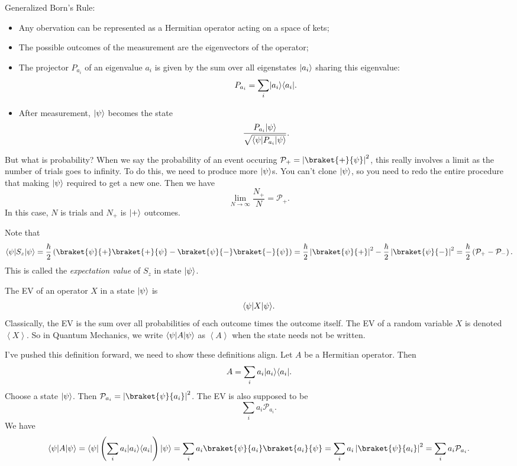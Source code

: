 \begin{mdframed}
	Generalized Born's Rule:
	\begin{itemize}
		\item Any obervation can be represented as a Hermitian operator acting on a space of kets;
		\item The possible outcomes of the measurement are the eigenvectors of the operator;
		\item The projector $P_{a_i} $ of an eigenvalue $a_i$ is given by the sum over all eigenstates $\lvert a_i\rangle $ sharing this eigenvalue:
			\[
				P_{a_i} =\sum_{i} \lvert a_i\rangle \langle a_i\rvert 
			.\]
		\item After measurement, $\lvert\psi \rangle $ becomes the state
			\[
				\frac{P_{a_i} \lvert\psi \rangle }{\sqrt{\langle\psi \rvert P_{a_i} \lvert\psi \rangle } } 
			.\]
	\end{itemize}
\end{mdframed}

But what is probability? When we say the probability of an event occuring $\mathcal{P}_+=\left| \braket{+}{\psi }  \right|^2$, this really involves a limit as the number of trials goes to infinity. To do this, we need to produce more $\lvert\psi \rangle $s. You can't clone $\lvert\psi \rangle $, so you need to redo the entire procedure that making $\lvert\psi \rangle $ required to get a new one. Then we have
\[
	\lim_{N \to \infty} \frac{N_+}{N} =\mathcal{P}_+
.\]
In this case, $N$ is trials and $N_+$ is $\lvert+\rangle $ outcomes.

Note that
\[
	\bra{\psi } S_z \ket{\psi } = \frac{\hbar}{2} \left( \braket{\psi }{+} \braket{+}{\psi } -\braket{\psi }{-} \braket{-}{\psi }  \right) =\frac{\hbar}{2} \left| \braket{\psi }{+}  \right| ^2 - \frac{\hbar}{2} \left| \braket{\psi }{-}  \right| ^2 = \frac{\hbar}{2} \left( \mathcal{P}_+-\mathcal{P}_- \right)
.\]
This is called the \emph{expectation value} of $S_z$ in state $\lvert\psi \rangle $.
\begin{definition}\label{dfn:EV}
	The EV of an operator $X$ in a state $\lvert\psi \rangle $ is
	\[
		\langle\psi \rvert X \lvert\psi \rangle
	.\]
	Classically, the EV is the sum over all probabilities of each outcome times the outcome itself. The EV of a random variable $X$ is denoted $\left\langle X \right\rangle $. So in Quantum Mechanics, we write $\langle\psi \rvert A \lvert\psi \rangle $ as $\left\langle A \right\rangle $ when the state needs not be written.
\end{definition}

I've pushed this definition forward, we need to show these definitions align. Let $A$ be a Hermitian operator. Then
\[
	A=\sum_{i} a_i \lvert a_i\rangle \langle a_i\rvert 
.\]
Choose a state $\lvert\psi \rangle $. Then $\mathcal{P}_{a_i} =\left| \braket{\psi }{a_i}  \right| ^2$. The EV is also supposed to be
\[
	\sum_{i} a_i \mathcal{P}_{a_i} 
.\]
We have
\[
	\bra{\psi } A \ket{\psi } =\bra{\psi } \left( \sum_{i} a_i \ket{a_i} \bra{a_i}  \right) \ket{\psi } =\sum_{i} a_i\braket{\psi }{a_i} \braket{a_i}{\psi } =\sum_{i} a_i\left| \braket{\psi }{a_i}  \right| ^2= \sum_{i} a_i \mathcal{P}_{a_i} 
.\]

